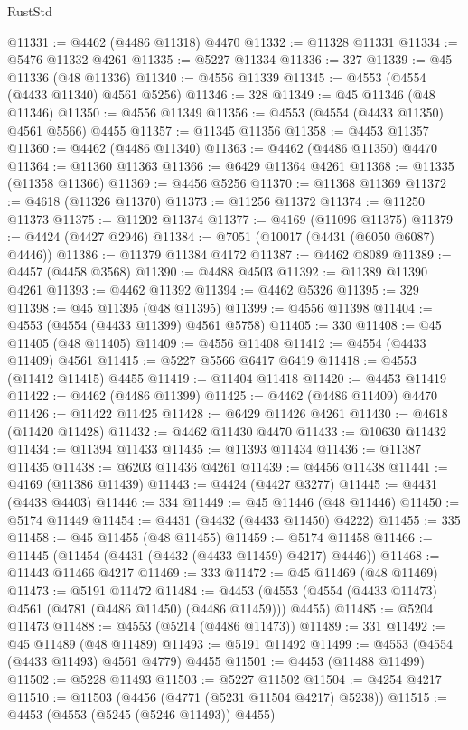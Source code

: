 \begin{lexlean}{RustStd}
\begin{coremodule}
@11331 := @4462 (@4486 @11318) @4470
@11332 := @11328 @11331
@11334 := @5476 @11332 @4261
@11335 := @5227 @11334
@11336 := 327
@11339 := @45 @11336 (@48 @11336)
@11340 := @4556 @11339
@11345 := @4553 (@4554 (@4433 @11340) @4561 @5256)
@11346 := 328
@11349 := @45 @11346 (@48 @11346)
@11350 := @4556 @11349
@11356 := @4553 (@4554 (@4433 @11350) @4561 @5566) @4455
@11357 := @11345 @11356
@11358 := @4453 @11357
@11360 := @4462 (@4486 @11340)
@11363 := @4462 (@4486 @11350) @4470
@11364 := @11360 @11363
@11366 := @6429 @11364 @4261
@11368 := @11335 (@11358 @11366)
@11369 := @4456 @5256
@11370 := @11368 @11369
@11372 := @4618 (@11326 @11370)
@11373 := @11256 @11372
@11374 := @11250 @11373
@11375 := @11202 @11374
@11377 := @4169 (@11096 @11375)
@11379 := @4424 (@4427 @2946)
@11384 := @7051 (@10017 (@4431 (@6050 @6087) @4446))
@11386 := @11379 @11384 @4172
@11387 := @4462 @8089
@11389 := @4457 (@4458 @3568)
@11390 := @4488 @4503
@11392 := @11389 @11390 @4261
@11393 := @4462 @11392
@11394 := @4462 @5326
@11395 := 329
@11398 := @45 @11395 (@48 @11395)
@11399 := @4556 @11398
@11404 := @4553 (@4554 (@4433 @11399) @4561 @5758)
@11405 := 330
@11408 := @45 @11405 (@48 @11405)
@11409 := @4556 @11408
@11412 := @4554 (@4433 @11409) @4561
@11415 := @5227 @5566 @6417 @6419
@11418 := @4553 (@11412 @11415) @4455
@11419 := @11404 @11418
@11420 := @4453 @11419
@11422 := @4462 (@4486 @11399)
@11425 := @4462 (@4486 @11409) @4470
@11426 := @11422 @11425
@11428 := @6429 @11426 @4261
@11430 := @4618 (@11420 @11428)
@11432 := @4462 @11430 @4470
@11433 := @10630 @11432
@11434 := @11394 @11433
@11435 := @11393 @11434
@11436 := @11387 @11435
@11438 := @6203 @11436 @4261
@11439 := @4456 @11438
@11441 := @4169 (@11386 @11439)
@11443 := @4424 (@4427 @3277)
@11445 := @4431 (@4438 @4403)
@11446 := 334
@11449 := @45 @11446 (@48 @11446)
@11450 := @5174 @11449
@11454 := @4431 (@4432 (@4433 @11450) @4222)
@11455 := 335
@11458 := @45 @11455 (@48 @11455)
@11459 := @5174 @11458
@11466 := @11445 (@11454 (@4431 (@4432 (@4433 @11459) @4217) @4446))
@11468 := @11443 @11466 @4217
@11469 := 333
@11472 := @45 @11469 (@48 @11469)
@11473 := @5191 @11472
@11484 := @4453 (@4553 (@4554 (@4433 @11473) @4561 (@4781 (@4486 @11450) (@4486 @11459))) @4455)
@11485 := @5204 @11473
@11488 := @4553 (@5214 (@4486 @11473))
@11489 := 331
@11492 := @45 @11489 (@48 @11489)
@11493 := @5191 @11492
@11499 := @4553 (@4554 (@4433 @11493) @4561 @4779) @4455
@11501 := @4453 (@11488 @11499)
@11502 := @5228 @11493
@11503 := @5227 @11502
@11504 := @4254 @4217
@11510 := @11503 (@4456 (@4771 (@5231 @11504 @4217) @5238))
@11515 := @4453 (@4553 (@5245 (@5246 @11493)) @4455)

\end{coremodule}
\end{lexlean}
